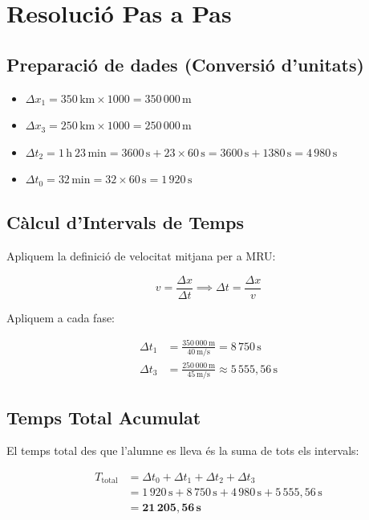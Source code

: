\documentclass[12pt,a4paper]{article}
\begin{document}
\section{Resolució Pas a Pas}

\subsection{Preparació de dades (Conversió d'unitats)}

\begin{itemize}
  \item $\Delta x_1 = 350\,\text{km} \times 1000 = 350\,000\,\text{m}$
  \item $\Delta x_3 = 250\,\text{km} \times 1000 = 250\,000\,\text{m}$
  \item $\Delta t_2 = 1\,\text{h}\ 23\,\text{min} = 3600\,\text{s} + 23 \times 60\,\text{s} = 3600\,\text{s} + 1380\,\text{s} = 4\,980\,\text{s}$
  \item $\Delta t_0 = 32\,\text{min} = 32 \times 60\,\text{s} = 1\,920\,\text{s}$
\end{itemize}

\subsection{Càlcul d'Intervals de Temps}

Apliquem la definició de velocitat mitjana per a MRU:

\begin{equation}
v = \frac{\Delta x}{\Delta t} \implies \Delta t = \frac{\Delta x}{v}
\label{eq:mrv}
\end{equation}

Apliquem a cada fase:

\begin{align*}
\Delta t_1 &= \frac{350\,000\,\text{m}}{40\,\text{m/s}} = 8\,750\,\text{s} \\[6pt]
\Delta t_3 &= \frac{250\,000\,\text{m}}{45\,\text{m/s}} \approx 5\,555{,}56\,\text{s}
\end{align*}

\subsection{Temps Total Acumulat}

El temps total des que l'alumne es lleva és la suma de tots els intervals:

\begin{align}
T_{\text{total}} &= \Delta t_0 + \Delta t_1 + \Delta t_2 + \Delta t_3 \\
                 &= 1\,920\,\text{s} + 8\,750\,\text{s} + 4\,980\,\text{s} + 5\,555{,}56\,\text{s} \\
                 &= \mathbf{21\,205{,}56\,\text{s}}
\label{eq:ttot}
\end{align}
\end{document}
